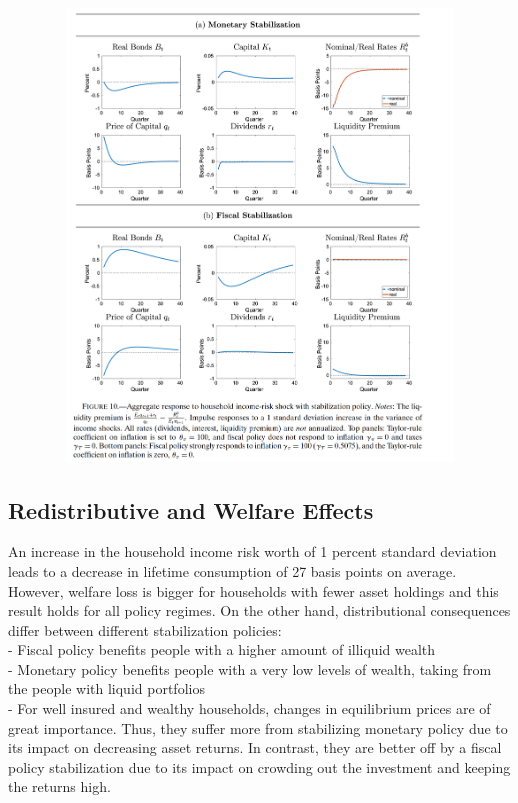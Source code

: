 \documentclass[titlepage]{\econtex}
\begin{document}
\begin{figure}[H]
  \centering
  \includegraphics[width=1\textwidth, height=12cm]{Figure10.png}
  \end{figure}

\hypertarget{Redistributive and Welfare Effects}{}
\subsection{Redistributive and Welfare Effects}

An increase in the household income risk worth of 1 percent  standard deviation leads to a decrease in lifetime consumption of 27 basis points on average. However, welfare loss is bigger for households with fewer asset holdings and this result holds for all policy regimes. On the other hand, distributional consequences differ between different stabilization policies:\\
- Fiscal policy benefits people with a higher amount of illiquid wealth\\
- Monetary policy benefits people with a very low levels of wealth, taking from the people with liquid portfolios\\
- For well insured and wealthy households, changes in equilibrium prices are of great importance. Thus, they suffer more from stabilizing monetary policy due to its impact on decreasing asset returns. In contrast, they are better off by a fiscal policy stabilization due to its impact on crowding out the investment and keeping the returns high.
\end{document}
